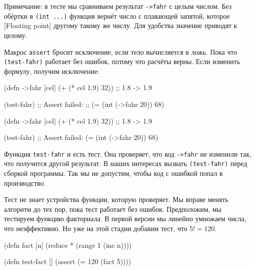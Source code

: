 Примечание: в тесте мы сравниваем результат \verb|->fahr| с целым числом. Без
обёртки в \verb|(int ...)| функция вернёт число с плавающей запятой, которое
[Floating point]
другому такому же числу. Для удобства значение приводят к целому.

Макрос \verb|assert| бросит исключение, если тело вычисляется в ложь. Пока что
\verb|(test-fahr)| работает без ошибок, потому что расчёты верны. Если изменить
формулу, получим исключение:

\ifnarrow

\begin{english}
  \begin{clojure}
(defn ->fahr [cel]
  (+ (* cel 1.9) 32)) ;; 1.8 -> 1.9

(test-fahr)
;; Assert failed:
;; (= (int (->fahr 20)) 68)
  \end{clojure}
\end{english}

\else

\begin{english}
  \begin{clojure}
(defn ->fahr [cel]
  (+ (* cel 1.9) 32)) ;; 1.8 -> 1.9

(test-fahr)
;; Assert failed: (= (int (->fahr 20)) 68)
  \end{clojure}
\end{english}

\fi

Функция \verb|test-fahr| и есть тест. Она проверяет, что код \verb|->fahr|
не изменили так, что получится другой результат. В наших интересах вызвать
\verb|(test-fahr)| перед сборкой программы. Так мы не допустим, чтобы код с
ошибкой попал в производство.


Тест не знает устройства функции, которую проверяет. Мы вправе менять алгоритм
до тех пор, пока тест работает без ошибок. Предположим, мы тестируем функцию
факториала. В первой версии мы линейно умножаем числа, что неэффективно. Но уже
на этой стадии добавим тест, что $5! = 120$.

\begin{english}
  \begin{clojure}
(defn fact [n]
  (reduce * (range 1 (inc n))))

(defn test-fact []
  (assert (= 120 (fact 5))))
  \end{clojure}
\end{english}


